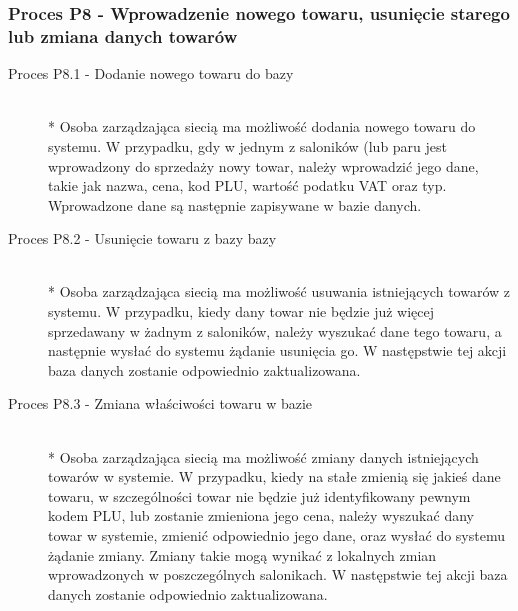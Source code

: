 \subsubsection{Proces P8 - Wprowadzenie nowego towaru, usunięcie starego lub zmiana danych towarów}
\begin{description}
\item[Proces P8.1 - Dodanie nowego towaru do bazy] ~\\*
Osoba zarządzająca siecią ma możliwość dodania nowego towaru do systemu. W przypadku, gdy w jednym z saloników (lub paru jest wprowadzony do sprzedaży nowy towar, należy wprowadzić jego dane, takie jak nazwa, cena, kod PLU, wartość podatku VAT oraz typ. Wprowadzone dane są następnie zapisywane w bazie danych.
\item[Proces P8.2 - Usunięcie towaru z bazy bazy] ~\\*
Osoba zarządzająca siecią ma możliwość usuwania istniejących towarów z systemu. W przypadku, kiedy dany towar nie będzie już więcej sprzedawany w żadnym z saloników, należy wyszukać dane tego towaru, a następnie wysłać do systemu żądanie usunięcia go. W następstwie tej akcji baza danych zostanie odpowiednio zaktualizowana.
\item[Proces P8.3 - Zmiana właściwości towaru w bazie] ~\\*	
Osoba zarządzająca siecią ma możliwość zmiany danych istniejących towarów w systemie. W przypadku, kiedy na stałe zmienią się jakieś dane towaru, w szczególności towar nie będzie już identyfikowany pewnym kodem PLU, lub zostanie zmieniona jego cena, należy wyszukać dany towar w systemie, zmienić odpowiednio jego dane, oraz wysłać do systemu żądanie zmiany. Zmiany takie mogą wynikać z lokalnych zmian wprowadzonych w poszczególnych salonikach. W następstwie tej akcji baza danych zostanie odpowiednio zaktualizowana.
\end{description}